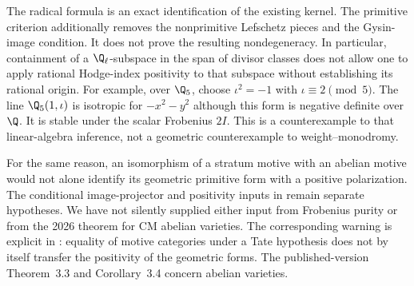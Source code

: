 \begin{remark}
\label{c:threefold-pairing-scope}
The radical formula is an exact identification of the existing
kernel.  The primitive criterion additionally removes the
nonprimitive Lefschetz pieces and the Gysin-image condition.
It does not prove the resulting nondegeneracy.
In particular, containment of a $\Q_\ell$-subspace in the span
of divisor classes does not allow one to apply rational
Hodge-index positivity to that subspace without establishing
its rational origin.  For example, over $\Q_5$, choose
$\iota^2=-1$ with $\iota\equiv2\pmod5$.
The line $\Q_5(1,\iota)$ is isotropic for $-x^2-y^2$ although
this form is negative definite over $\Q$.
It is stable under the scalar Frobenius $2I$.
This is a counterexample to that linear-algebra inference,
not a geometric counterexample to weight--monodromy.

For the same reason, an isomorphism of a stratum motive with
an abelian motive would not alone identify its geometric
primitive form with a positive polarization.  The conditional
image-projector and positivity inputs in
\citet[Theorem~0.4 and \S\S4.1--4.3]{c_msaito2003positivity}
remain separate hypotheses.  We have not silently supplied
either input from Frobenius purity or from the 2026 theorem
for CM abelian varieties.
The corresponding warning is explicit in
\citet[submitted version, Remark~4.10 and footnote~3,
p.~14]{DMilne2002Polarizations}: equality of motive categories
under a Tate hypothesis does not by itself transfer the
positivity of the geometric forms.  The published-version
Theorem~3.3 and Corollary~3.4 concern abelian varieties.
\end{remark}
